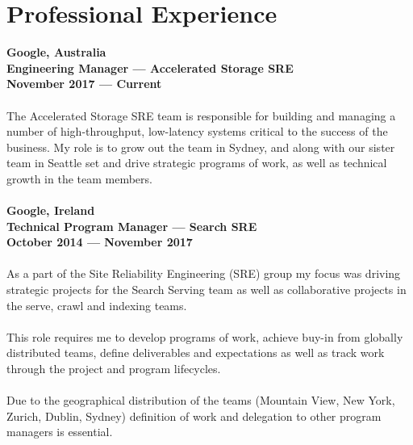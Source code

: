 \documentclass[a4paper]{article}
\begin{document}
\section*{Professional Experience}
\textbf{Google, Australia\\Engineering Manager --- Accelerated Storage SRE\\November 2017 --- Current}\\\\
The Accelerated Storage SRE team is responsible for building and managing a number of high-throughput, low-latency systems critical to the success of the business. My role is to grow out the team in Sydney, and along with our sister team in Seattle set and drive strategic programs of work, as well as technical growth in the team members.
\\\\
\textbf{Google, Ireland\\Technical Program Manager --- Search SRE\\October 2014 --- November 2017}\\\\
As a part of the Site Reliability Engineering (SRE) group my focus was driving strategic projects for the Search Serving team as well as collaborative projects in the serve, crawl and indexing teams.
\\\\
This role requires me to develop programs of work, achieve buy-in from globally distributed teams, define deliverables and expectations as well as track work through the project and program lifecycles.
\\\\
Due to the geographical distribution of the teams (Mountain View, New York, Zurich, Dublin, Sydney) definition of work and delegation to other program managers is essential.
\end{document}

